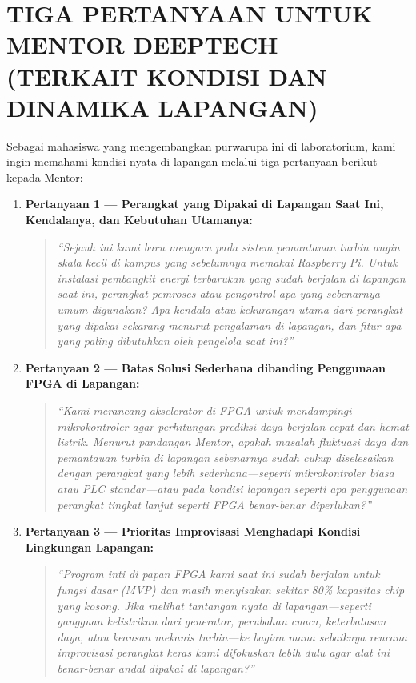 \documentclass[12pt,a4paper]{article}
\begin{document}
\section{TIGA PERTANYAAN UNTUK MENTOR DEEPTECH (TERKAIT KONDISI DAN DINAMIKA LAPANGAN)}

Sebagai mahasiswa yang mengembangkan purwarupa ini di laboratorium, kami ingin memahami kondisi nyata di lapangan melalui tiga pertanyaan berikut kepada Mentor:

\begin{enumerate}[leftmargin=0.7cm, itemsep=8pt]
    \item \textbf{Pertanyaan 1 — Perangkat yang Dipakai di Lapangan Saat Ini, Kendalanya, dan Kebutuhan Utamanya:}
    \begin{quote}
    \itshape
    ``Sejauh ini kami baru mengacu pada sistem pemantauan turbin angin skala kecil di kampus yang sebelumnya memakai Raspberry Pi. Untuk instalasi pembangkit energi terbarukan yang sudah berjalan di lapangan saat ini, perangkat pemroses atau pengontrol apa yang sebenarnya umum digunakan? Apa kendala atau kekurangan utama dari perangkat yang dipakai sekarang menurut pengalaman di lapangan, dan fitur apa yang paling dibutuhkan oleh pengelola saat ini?''
    \end{quote}

    \item \textbf{Pertanyaan 2 — Batas Solusi Sederhana dibanding Penggunaan FPGA di Lapangan:}
    \begin{quote}
    \itshape
    ``Kami merancang akselerator di FPGA untuk mendampingi mikrokontroler agar perhitungan prediksi daya berjalan cepat dan hemat listrik. Menurut pandangan Mentor, apakah masalah fluktuasi daya dan pemantauan turbin di lapangan sebenarnya sudah cukup diselesaikan dengan perangkat yang lebih sederhana—seperti mikrokontroler biasa atau PLC standar—atau pada kondisi lapangan seperti apa penggunaan perangkat tingkat lanjut seperti FPGA benar-benar diperlukan?''
    \end{quote}

    \item \textbf{Pertanyaan 3 — Prioritas Improvisasi Menghadapi Kondisi Lingkungan Lapangan:}
    \begin{quote}
    \itshape
    ``Program inti di papan FPGA kami saat ini sudah berjalan untuk fungsi dasar (MVP) dan masih menyisakan sekitar 80\% kapasitas chip yang kosong. Jika melihat tantangan nyata di lapangan—seperti gangguan kelistrikan dari generator, perubahan cuaca, keterbatasan daya, atau keausan mekanis turbin—ke bagian mana sebaiknya rencana improvisasi perangkat keras kami difokuskan lebih dulu agar alat ini benar-benar andal dipakai di lapangan?''
    \end{quote}
\end{enumerate}
\end{document}
